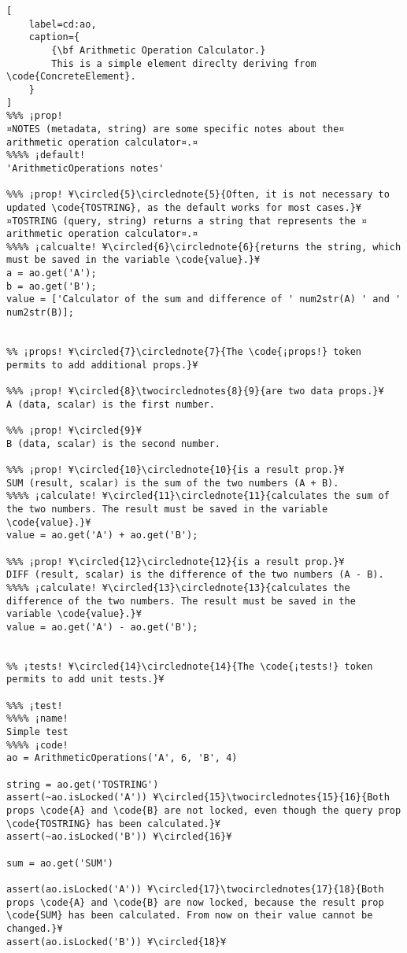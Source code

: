 \documentclass{tufte-handout}
\begin{document}
\begin{lstlisting}[
	label=cd:ao,
	caption={
		{\bf Arithmetic Operation Calculator.}
		This is a simple element direclty deriving from \code{ConcreteElement}.
	}
]
%%% ¡prop!
¤NOTES (metadata, string) are some specific notes about the¤ arithmetic operation calculator¤.¤
%%%% ¡default!
'ArithmeticOperations notes'

%%% ¡prop! ¥\circled{5}\circlednote{5}{Often, it is not necessary to updated \code{TOSTRING}, as the default works for most cases.}¥
¤TOSTRING (query, string) returns a string that represents the ¤ arithmetic operation calculator¤.¤
%%%% ¡calcualte! ¥\circled{6}\circlednote{6}{returns the string, which must be saved in the variable \code{value}.}¥
a = ao.get('A');
b = ao.get('B');
value = ['Calculator of the sum and difference of ' num2str(A) ' and ' num2str(B)];


%% ¡props! ¥\circled{7}\circlednote{7}{The \code{¡props!} token permits to add additional props.}¥

%%% ¡prop! ¥\circled{8}\twocirclednotes{8}{9}{are two data props.}¥
A (data, scalar) is the first number.

%%% ¡prop! ¥\circled{9}¥
B (data, scalar) is the second number.

%%% ¡prop! ¥\circled{10}\circlednote{10}{is a result prop.}¥
SUM (result, scalar) is the sum of the two numbers (A + B).
%%%% ¡calculate! ¥\circled{11}\circlednote{11}{calculates the sum of the two numbers. The result must be saved in the variable \code{value}.}¥
value = ao.get('A') + ao.get('B');

%%% ¡prop! ¥\circled{12}\circlednote{12}{is a result prop.}¥
DIFF (result, scalar) is the difference of the two numbers (A - B).
%%%% ¡calculate! ¥\circled{13}\circlednote{13}{calculates the difference of the two numbers. The result must be saved in the variable \code{value}.}¥
value = ao.get('A') - ao.get('B');


%% ¡tests! ¥\circled{14}\circlednote{14}{The \code{¡tests!} token permits to add unit tests.}¥

%%% ¡test!
%%%% ¡name!
Simple test
%%%% ¡code!
ao = ArithmeticOperations('A', 6, 'B', 4)

string = ao.get('TOSTRING')
assert(~ao.isLocked('A')) ¥\circled{15}\twocirclednotes{15}{16}{Both props \code{A} and \code{B} are not locked, even though the query prop \code{TOSTRING} has been calculated.}¥
assert(~ao.isLocked('B')) ¥\circled{16}¥

sum = ao.get('SUM')

assert(ao.isLocked('A')) ¥\circled{17}\twocirclednotes{17}{18}{Both props \code{A} and \code{B} are now locked, because the result prop \code{SUM} has been calculated. From now on their value cannot be changed.}¥
assert(ao.isLocked('B')) ¥\circled{18}¥


\end{lstlisting}
\end{document}
